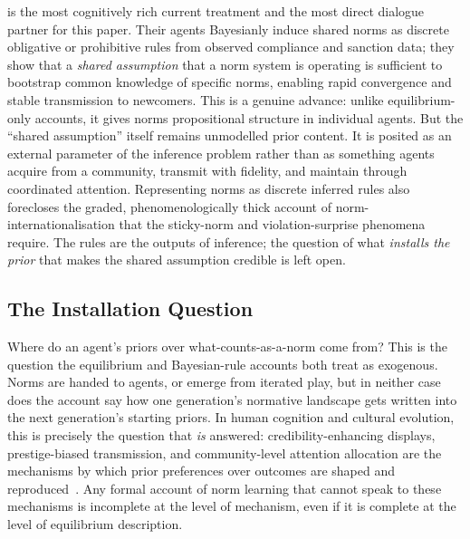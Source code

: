 \citet{oldenburgZhiXuan2024BayesianRule} is the most cognitively rich current
treatment and the most direct dialogue partner for this paper. Their agents
Bayesianly induce shared norms as discrete obligative or prohibitive rules from
observed compliance and sanction data; they show that a \textit{shared
assumption} that a norm system is operating is sufficient to bootstrap common
knowledge of specific norms, enabling rapid convergence and stable transmission
to newcomers. This is a genuine advance: unlike equilibrium-only accounts, it
gives norms propositional structure in individual agents. But the ``shared
assumption'' itself remains unmodelled prior content. It is posited as an
external parameter of the inference problem rather than as something agents
acquire from a community, transmit with fidelity, and maintain through
coordinated attention. Representing norms as discrete inferred rules also
forecloses the graded, phenomenologically thick account of norm-internationalisation
that the sticky-norm and violation-surprise phenomena require. The rules are
the outputs of inference; the question of what \textit{installs the prior} that
makes the shared assumption credible is left open.

\subsection*{The Installation Question}

Where do an agent's priors over what-counts-as-a-norm come from? This is the
question the equilibrium and Bayesian-rule accounts both treat as exogenous.
Norms are handed to agents, or emerge from iterated play, but in neither case
does the account say how one generation's normative landscape gets written into
the next generation's starting priors. In human cognition and cultural evolution,
this is precisely the question that \textit{is} answered: credibility-enhancing
displays, prestige-biased transmission, and community-level attention allocation
are the mechanisms by which prior preferences over outcomes are shaped and
reproduced~\citep{henrich2009CREDs}. Any formal account of norm learning that
cannot speak to these mechanisms is incomplete at the level of mechanism, even
if it is complete at the level of equilibrium description.

